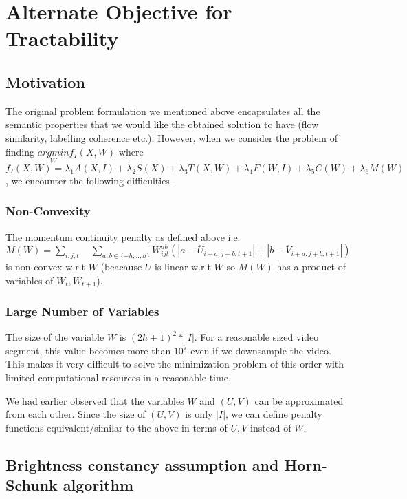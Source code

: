 \section{Alternate Objective for Tractability}


\subsection{Motivation}

The original problem formulation we mentioned above encapsulates all
the semantic properties that we would like the obtained solution to
have (flow similarity, labelling coherence etc.). However, when we
consider the problem of finding $\underset{W}{argmin}f_{I}(X,W)$
where $f_{I}(X,W)=\lambda_{1}A(X,I)+\lambda_{2}S(X)+\lambda_{3}T(X,W)+\lambda_{4}F(W,I)+\lambda_{5}C(W)+\lambda_{6}M(W)$,
we encounter the following difficulties -


\subsubsection*{Non-Convexity}

The momentum continuity penalty as defined above i.e. $M(W)=\underset{i,j,t}{\sum}\quad\underset{a,b\in\{-h,..,h\}}{\sum}W_{ijt}^{ab}(|a-\overline{U}_{i+a,j+b,t+1}|+|b-\overline{V}_{i+a,j+b,t+1}|)$
is non-convex w.r.t $W$ (beacause $U$ is linear w.r.t $W$ so $M(W)$
has a product of variables of $W_{t},W_{t+1}$).


\subsubsection*{Large Number of Variables}

The size of the variable $W$ is $(2h+1)^{2}*|I|$. For a reasonable
sized video segment, this value becomes more than $10^{7}$ even if
we downsample the video. This makes it very difficult to solve the
minimization problem of this order with limited computational resources in a reasonable time.

\medskip{}


We had earlier observed that the variables $W$ and $(U,V)$ can be
approximated from each other. Since the size of $(U,V)$ is only $|I|$,
we can define penalty functions equivalent/similar to the above in
terms of $U,V$ instead of $W$.


\subsection{Brightness constancy assumption and Horn-Schunk algorithm}

